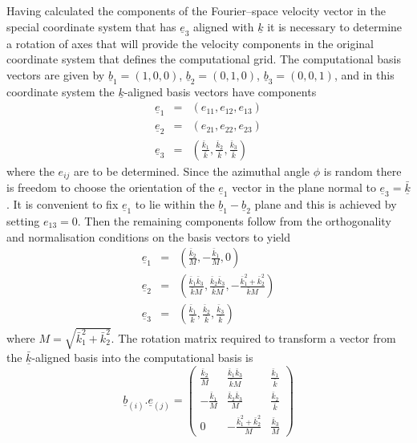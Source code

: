 \documentclass[dvips]{article}
\begin{document}
Having calculated the components of the Fourier--space velocity vector in
the special coordinate system that has $\underline{e}_{3}$ aligned with
$\underline{k}$ it is necessary to determine a rotation of axes that will
provide the velocity components in the original coordinate system that
defines the computational grid.  The computational basis vectors are 
given by $\underline{b}_{1}=(1,0,0)$, $\underline{b}_{2}=(0,1,0)$,
$\underline{b}_{3}=(0,0,1)$, and in this coordinate system the
$\underline{k}$-aligned basis vectors have components
\begin{eqnarray}
\underline{e}_{1} & = & \left(e_{11},e_{12},e_{13}\right) \nonumber\\
\underline{e}_{2} & = & \left(e_{21},e_{22},e_{23}\right) \nonumber\\
\underline{e}_{3} & = &
\left(\frac{\bar{k}_{1}}{\bar{k}},\frac{\bar{k}_{2}}{\bar{k}},\frac{\bar{k}_{3}}{\bar{k}}\right)  
\end{eqnarray}
where the $e_{ij}$ are to be determined.  Since the azimuthal angle
$\phi$ is random there is freedom to choose the orientation of the
$\underline{e}_{1}$ vector in the plane normal to
$\underline{e}_{3}=\underline{\bar{k}}$.  It is convenient to fix
$\underline{e}_{1}$ to lie within the $\underline{b}_{1}-\underline{b}_{2}$
plane and this is achieved by setting $e_{13}=0$.  Then the remaining
components follow from the orthogonality and normalisation conditions on
the basis vectors to yield
\begin{eqnarray}
\underline{e}_{1} & = &
\left(\frac{\bar{k}_{2}}{M},-\frac{\bar{k}_{1}}{M},0\right) \nonumber\\
\underline{e}_{2} & = &
\left(\frac{\bar{k}_{1}\bar{k}_{3}}{\bar{k}M},\frac{\bar{k}_{2}\bar{k}_{3}}{\bar{k}M},
-\frac{\bar{k}_{1}^{2}+\bar{k}_{2}^{2}}{\bar{k}M}\right) \nonumber\\
\underline{e}_{3} & = &
\left(\frac{\bar{k}_{1}}{\bar{k}},\frac{\bar{k}_{2}}{\bar{k}},\frac{\bar{k}_{3}}{\bar{k}}\right)  
\end{eqnarray}
where $M=\sqrt{\bar{k}_{1}^{2}+\bar{k}_{2}^{2}}$.  The rotation matrix required to transform
a vector from the $\underline{\bar{k}}$-aligned basis into the computational
basis is
\begin{equation}
\underline{b}_{(i)}.\underline{e}_{(j)} = 
\left(
\begin{array}{ccc}
\frac{\bar{k}_{2}}{M}   &  \frac{\bar{k}_{1}\bar{k}_{3}}{\bar{k}M}
&  \frac{\bar{k}_{1}}{\bar{k}} \\[2mm]
-\frac{\bar{k}_{1}}{M}  &  \frac{\bar{k}_{2}\bar{k}_{3}}{M}            &
\frac{\bar{k}_{2}}{\bar{k}} \\[2mm]
0                 &  -\frac{\bar{k}_{1}^{2}+\bar{k}_{2}^{2}}{M}  &
\frac{\bar{k}_{3}}{M} 
\end{array}
\right)
\end{equation}
\end{document}
